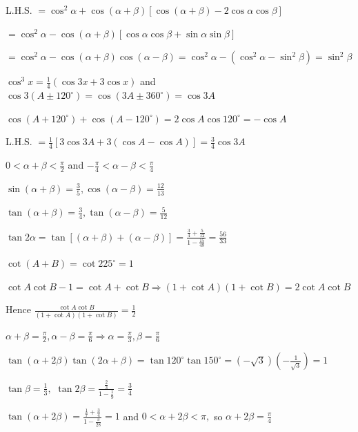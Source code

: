 \item L.H.S. $= \cos^2\alpha + \cos(\alpha + \beta)[\cos(\alpha + \beta) - 2\cos\alpha\cos\beta]$

  $= \cos^2\alpha - \cos(\alpha + \beta)[\cos\alpha\cos\beta + \sin\alpha\sin\beta]$

  $= \cos^2\alpha - \cos(\alpha + \beta)\cos(\alpha - \beta) = \cos^2\alpha - (\cos^2\alpha - \sin^2\beta) =
  \sin^2\beta$

\item $\cos^3 x = \frac{1}{4}(\cos 3x + 3\cos x)$ and $\cos 3(A \pm 120^\circ) = \cos(3A \pm 360^\circ) = \cos 3A$

  $\cos(A + 120^\circ) + \cos(A - 120^\circ) = 2\cos A\cos 120^\circ = -\cos A$

  L.H.S. $= \frac{1}{4}[3\cos 3A + 3(\cos A - \cos A)] = \frac{3}{4}\cos 3A$

\item $0 < \alpha + \beta < \frac{\pi}{2}$ and $-\frac{\pi}{4} < \alpha - \beta < \frac{\pi}{4}$

  $\sin(\alpha + \beta) = \frac{3}{5}, \cos(\alpha - \beta) = \frac{12}{13}$

  $\tan(\alpha + \beta) = \frac{3}{4}, \tan(\alpha - \beta) = \frac{5}{12}$

  $\tan 2\alpha = \tan[(\alpha + \beta) + (\alpha - \beta)] = \frac{\frac{3}{4} + \frac{5}{12}}{1 - \frac{15}{48}} =
  \frac{56}{33}$

\item $\cot(A + B) = \cot 225^\circ = 1$

  $\cot A\cot B - 1 = \cot A + \cot B \Rightarrow (1 + \cot A)(1 + \cot B) = 2\cot A\cot B$

  Hence $\frac{\cot A\cot B}{(1 + \cot A)(1 + \cot B)} = \frac{1}{2}$

\item $\alpha + \beta = \frac{\pi}{2}, \alpha - \beta = \frac{\pi}{6} \Rightarrow \alpha = \frac{\pi}{3}, \beta =
  \frac{\pi}{6}$

  $\tan(\alpha + 2\beta)\tan(2\alpha + \beta) = \tan 120^\circ\tan 150^\circ = (-\sqrt{3})\left(-\frac{1}{\sqrt{3}}\right)
  = 1$

\item $\tan\beta = \frac{1}{3},$ $\tan 2\beta = \frac{\frac{2}{3}}{1 - \frac{1}{9}} = \frac{3}{4}$

  $\tan(\alpha + 2\beta) = \frac{\frac{1}{7} + \frac{3}{4}}{1 - \frac{3}{28}} = 1$ and $0 < \alpha + 2\beta < \pi,$ so
  $\alpha + 2\beta = \frac{\pi}{4}$

